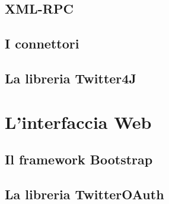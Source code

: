 \subsection{XML-RPC}
\subsection{I connettori}
\subsection{La libreria Twitter4J}

\section{L'interfaccia Web}

\subsection{Il framework Bootstrap}
\subsection{La libreria TwitterOAuth}

